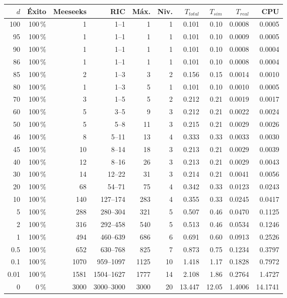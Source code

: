\begin{tabular}{rrrrrrrrrr}
\toprule
$d$ & Éxito & Meeseeks & RIC & Máx. & Niv. & $T_{total}$ & $T_{sim}$ & $T_{real}$ & CPU \\
\midrule
100 & 100\,\% & 1 & 1--1 & 1 & 1 & 0.101 & 0.10 & 0.0008 & 0.0005 \\
95 & 100\,\% & 1 & 1--1 & 1 & 1 & 0.101 & 0.10 & 0.0009 & 0.0005 \\
90 & 100\,\% & 1 & 1--1 & 1 & 1 & 0.101 & 0.10 & 0.0008 & 0.0004 \\
86 & 100\,\% & 1 & 1--1 & 1 & 1 & 0.101 & 0.10 & 0.0008 & 0.0004 \\
85 & 100\,\% & 2 & 1--3 & 3 & 2 & 0.156 & 0.15 & 0.0014 & 0.0010 \\
80 & 100\,\% & 1 & 1--3 & 5 & 1 & 0.101 & 0.10 & 0.0010 & 0.0005 \\
70 & 100\,\% & 3 & 1--5 & 5 & 2 & 0.212 & 0.21 & 0.0019 & 0.0017 \\
60 & 100\,\% & 5 & 3--5 & 9 & 3 & 0.212 & 0.21 & 0.0022 & 0.0024 \\
50 & 100\,\% & 5 & 5--8 & 11 & 3 & 0.215 & 0.21 & 0.0029 & 0.0026 \\
46 & 100\,\% & 8 & 5--11 & 13 & 4 & 0.333 & 0.33 & 0.0033 & 0.0030 \\
45 & 100\,\% & 10 & 8--14 & 18 & 3 & 0.213 & 0.21 & 0.0029 & 0.0039 \\
40 & 100\,\% & 12 & 8--16 & 26 & 3 & 0.213 & 0.21 & 0.0029 & 0.0043 \\
30 & 100\,\% & 14 & 12--22 & 31 & 3 & 0.214 & 0.21 & 0.0041 & 0.0056 \\
20 & 100\,\% & 68 & 54--71 & 75 & 4 & 0.342 & 0.33 & 0.0123 & 0.0243 \\
10 & 100\,\% & 140 & 127--174 & 283 & 4 & 0.355 & 0.33 & 0.0245 & 0.0417 \\
5 & 100\,\% & 288 & 280--304 & 321 & 5 & 0.507 & 0.46 & 0.0470 & 0.1125 \\
2 & 100\,\% & 316 & 292--458 & 540 & 5 & 0.513 & 0.46 & 0.0534 & 0.1246 \\
1 & 100\,\% & 494 & 460--639 & 686 & 6 & 0.691 & 0.60 & 0.0913 & 0.2526 \\
0.5 & 100\,\% & 652 & 630--768 & 825 & 7 & 0.873 & 0.75 & 0.1234 & 0.3797 \\
0.1 & 100\,\% & 1070 & 959--1097 & 1125 & 10 & 1.418 & 1.17 & 0.1828 & 0.7972 \\
0.01 & 100\,\% & 1581 & 1504--1627 & 1777 & 14 & 2.108 & 1.86 & 0.2764 & 1.4727 \\
0 & 0\,\% & 3000 & 3000--3000 & 3000 & 20 & 13.447 & 12.05 & 1.4006 & 14.1741 \\
\bottomrule
\end{tabular}
